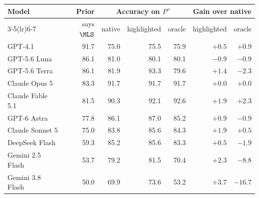 \begin{tabularx}{\linewidth}{@{}Xr rrr rr@{}}
\toprule
Model & Prior & \multicolumn{3}{c}{Accuracy on $P^{+}$} & \multicolumn{2}{c}{Gain over native}\\
\cmidrule(lr){3-5}\cmidrule(lr){6-7}
 & says $\MLS$ & native & highlighted & oracle & highlighted & oracle\\
\midrule
GPT-4.1 & 91.7 & 75.0 & 75.5 & 75.9 & $+0.5$ & $+0.9$\\
GPT-5.6 Luna & 86.1 & 81.0 & 80.1 & 80.1 & $-0.9$ & $-0.9$\\
GPT-5.6 Terra & 86.1 & 81.9 & 83.3 & 79.6 & $+1.4$ & $-2.3$\\
Claude Opus 5 & 83.3 & 91.7 & 91.7 & 91.7 & $+0.0$ & $+0.0$\\
Claude Fable 5.1 & 81.5 & 90.3 & 92.1 & 92.6 & $+1.9$ & $+2.3$\\
GPT-6 Astra & 77.8 & 86.1 & 87.0 & 85.2 & $+0.9$ & $-0.9$\\
Claude Sonnet 5 & 75.0 & 83.8 & 85.6 & 84.3 & $+1.9$ & $+0.5$\\
DeepSeek Flash & 59.3 & 85.2 & 85.6 & 83.3 & $+0.5$ & $-1.9$\\
Gemini 2.5 Flash & 53.7 & 79.2 & 81.5 & 70.4 & $+2.3$ & $\mathbf{-8.8}$\\
Gemini 3.8 Flash & 50.0 & 69.9 & 73.6 & 53.2 & $\mathbf{+3.7}$ & $\mathbf{-16.7}$\\
\bottomrule
\end{tabularx}
